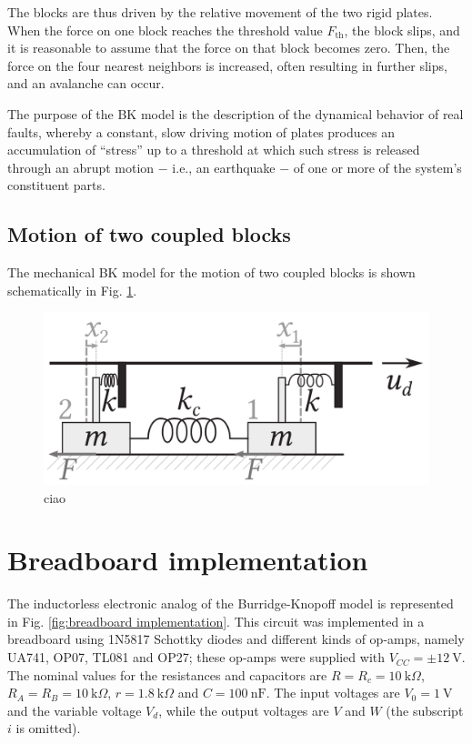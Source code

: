 The blocks are thus driven by the relative movement of the two rigid plates. When the force on one block
reaches the threshold value $F_{\text{th}}$, the block slips, and it is reasonable to assume that the
force on that block becomes zero. Then, the force on the four nearest neighbors is increased, often
resulting in further slips, and an avalanche can occur.

The purpose of the BK model is the description of the dynamical behavior of
real faults, whereby a constant, slow driving motion of plates produces an accumulation of ``stress''
up to a threshold at which such stress is released through an abrupt motion $-$ i.e., an earthquake $-$
of one or more of the system's constituent parts.

\subsection{Motion of two coupled blocks}
\label{subsec: diff eqs for two blocks}

The mechanical BK model for the motion of two coupled blocks is shown schematically in
Fig. \ref{fig: 2 blocks motion}.

\begin{figure}[H]
    \centering
    \includegraphics[width=0.5\linewidth]{images/bk_2_blocks.png}
    \caption{ciao}
    \label{fig: 2 blocks motion}
\end{figure}


\section{Breadboard implementation}\label{sec:breadboard}

The inductorless electronic analog of the Burridge-Knopoff model
\cite{main_paper} is represented in Fig.
\ref{fig:breadboard implementation}. This circuit was implemented
in a breadboard using 1N5817 Schottky diodes and different kinds
of op-amps, namely UA741, OP07, TL081 and OP27; these op-amps were
supplied with $V_{CC}=\pm12~\text{V}$. The nominal values for the
resistances and capacitors are $R=R_c=10~\text{k}\Omega$,
$R_A=R_B=10~\text{k}\Omega$, $r=1.8~\text{k}\Omega$ and
$C=100~\text{nF}$. The input voltages are $V_0=1~\text{V}$ and
the variable voltage $V_d$, while the output voltages are
$V$ and $W$ (the subscript $i$ is omitted).

